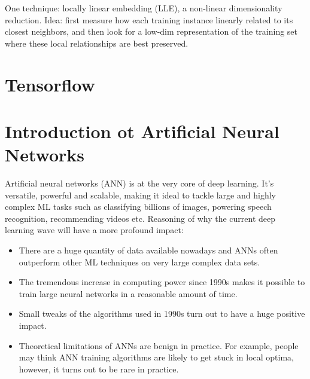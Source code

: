 \documentclass[12pt,oneside,a4paper]{article}
\numberwithin{equation}{section}
\begin{document}
One technique: locally linear embedding (LLE), a non-linear dimensionality reduction. Idea: first measure how each training instance linearly related to its closest neighbors, and then look for a low-dim representation of the training set where these local relationships are best preserved.

\section{Tensorflow}

\section{Introduction ot Artificial Neural Networks}

Artificial neural networks (ANN) is at the very core of deep learning. It's versatile, powerful and scalable, making it ideal to tackle large and highly complex ML tasks such as classifying billions of images, powering speech recognition, recommending videos etc. Reasoning of why the current deep learning wave will have a more profound impact: 

\begin{itemize}
\item There are a huge quantity of data available nowadays and ANNs often outperform other ML techniques on very large complex data sets. 
\item The tremendous increase in computing power since 1990s makes it possible to train large neural networks in a reasonable amount of time.

\item Small tweaks of the algorithms used in 1990s turn out to have a huge positive impact. 

\item Theoretical limitations of ANNs are benign in practice. For example, people may think ANN training algorithms are likely to get stuck in local optima, however, it turns out to be rare in practice.  
\end{itemize}
\end{document}
